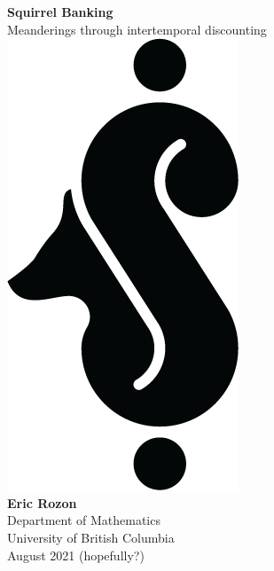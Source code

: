\documentclass[titlepage, hidelinks, 12pt]{article}
\theoremstyle{plain}
\theoremstyle{remark}
\theoremstyle{definition}
\begin{document}
\begin{titlepage}
   \begin{center}
       \vspace*{1cm}
\Huge
       \textbf{Squirrel Banking} \\
\Large
       \vspace{0.5cm}
       Meanderings through intertemporal discounting  \\
            
       \vspace{4.1cm}
       \includegraphics[scale = 1.4]{sb_logo_black.png} \\
       \vspace*{\fill}
       \textbf{Eric Rozon} \\

            
       Department of Mathematics\\
       University of British Columbia\\
       August 2021 (hopefully?) 
            
   \end{center}
\end{titlepage}




\end{document}

